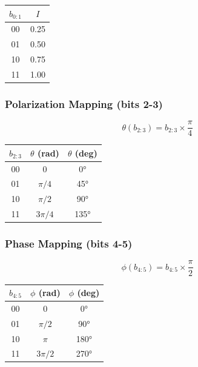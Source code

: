 \documentclass[11pt,a4paper]{article}
\begin{document}
\begin{center}
\begin{tabular}{cc}
\toprule
$b_{0:1}$ & $I$ \\
\midrule
00 & 0.25 \\
01 & 0.50 \\
10 & 0.75 \\
11 & 1.00 \\
\bottomrule
\end{tabular}
\end{center}

\subsubsection{Polarization Mapping (bits 2-3)}

\begin{equation}
    \theta(b_{2:3}) = b_{2:3} \times \frac{\pi}{4}
\end{equation}

\begin{center}
\begin{tabular}{ccc}
\toprule
$b_{2:3}$ & $\theta$ (rad) & $\theta$ (deg) \\
\midrule
00 & 0 & 0° \\
01 & $\pi/4$ & 45° \\
10 & $\pi/2$ & 90° \\
11 & $3\pi/4$ & 135° \\
\bottomrule
\end{tabular}
\end{center}

\subsubsection{Phase Mapping (bits 4-5)}

\begin{equation}
    \phi(b_{4:5}) = b_{4:5} \times \frac{\pi}{2}
\end{equation}

\begin{center}
\begin{tabular}{ccc}
\toprule
$b_{4:5}$ & $\phi$ (rad) & $\phi$ (deg) \\
\midrule
00 & 0 & 0° \\
01 & $\pi/2$ & 90° \\
10 & $\pi$ & 180° \\
11 & $3\pi/2$ & 270° \\
\bottomrule
\end{tabular}
\end{center}
\end{document}
